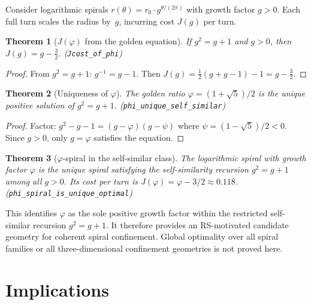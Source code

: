 \documentclass[11pt,a4paper]{article}
\newtheorem{theorem}{Theorem}[section]
\theoremstyle{definition}
\newcommand{\phig}{\varphi}
\newcommand{\Jc}{J}
\newcommand{\code}[1]{\texttt{\small #1}}
\begin{document}
Consider logarithmic spirals $r(\theta) = r_0 \cdot g^{\theta/(2\pi)}$
with growth factor $g > 0$.  Each full turn scales the radius by~$g$,
incurring cost $\Jc(g)$ per turn.

\begin{theorem}[$\Jc(\phig)$ from the golden equation]\label{thm:Jphi}
If $g^2 = g + 1$ and $g > 0$, then $\Jc(g) = g - \tfrac{3}{2}$.
\textup{(\code{Jcost\_of\_phi})}
\end{theorem}

\begin{proof}
From $g^2 = g+1$: $g^{-1} = g - 1$.  Then
$\Jc(g) = \tfrac{1}{2}(g + g-1) - 1 = g - \tfrac{3}{2}$.
\end{proof}

\begin{theorem}[Uniqueness of $\phig$]\label{thm:phi-unique}
The golden ratio $\phig = (1+\sqrt{5})/2$ is the unique positive solution
of $g^2 = g + 1$.
\textup{(\code{phi\_unique\_self\_similar})}
\end{theorem}

\begin{proof}
Factor: $g^2 - g - 1 = (g - \phig)(g - \psi)$ where
$\psi = (1-\sqrt 5)/2 < 0$.  Since $g > 0$, only $g = \phig$ satisfies
the equation.
\end{proof}

\begin{theorem}[$\phig$-spiral in the self-similar class]
\label{thm:phi-optimal}
The logarithmic spiral with growth factor $\phig$ is the unique spiral
satisfying the self-similarity recursion $g^2 = g + 1$ among all $g > 0$.
Its cost per turn is $\Jc(\phig) = \phig - 3/2 \approx 0.118$.
\textup{(\code{phi\_spiral\_is\_unique\_optimal})}
\end{theorem}

This identifies $\phig$ as the sole positive growth factor within the
restricted self-similar recursion $g^2 = g + 1$.  It therefore provides an
RS-motivated candidate geometry for coherent spiral confinement.  Global
optimality over all spiral families or all three-dimensional confinement
geometries is not proved here.

\section{Implications}
\label{sec:implications}
\end{document}
